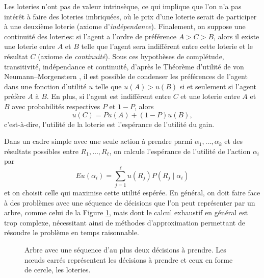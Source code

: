 \documentclass[a4paper,11pt]{article}
\theoremstyle{plain}
\theoremstyle{definition}
\begin{document}
Les loteries n'ont pas de valeur intrinsèque, ce qui implique que l'on n'a pas intérêt à faire des loteries imbriquées, où le prix d'une loterie serait de participer à une deuxième loterie (axiome d'\emph{indépendance}). Finalement, on suppose une continuité des loteries: si l'agent a l'ordre de préférence $A > C > B$, alors il existe une loterie entre $A$ et $B$ telle que l'agent sera indifférent entre cette loterie et le résultat $C$ (axiome de \emph{continuité}). Sous ces hypothèses de complétude, transitivité, indépendance et continuité, d'après le Théorème d'utilité de von Neumann--Morgenstern \cite{vonNeumann1953Theory}, il est possible de condenser les préférences de l'agent dans une fonction d'utilité $u$ telle que $u(A) > u(B)$ si et seulement si l'agent préfère $A$ à $B$. En plus, si l'agent est indifférent entre $C$ et une loterie entre $A$ et $B$ avec probabilités respectives $P$ et $1-P$, alors \[u(C) = Pu(A) + (1-P)u(B),\] c'est-à-dire, l'utilité de la loterie est l'espérance de l'utilité du gain.

Dans un cadre simple avec une seule action à prendre parmi $\alpha_1, \dotsc, \alpha_k$ et des résultats possibles entre $R_1, \dotsc, R_\ell$, on calcule l'espérance de l'utilité de l'action $\alpha_i$ par \[Eu(\alpha_i) = \sum_{j = 1}^\ell u(R_j)P(R_j\mid\alpha_i)\] et on choisit celle qui maximise cette utilité espérée. En général, on doit faire face à des problèmes avec une séquence de décisions que l'on peut représenter par un arbre, comme celui de la Figure \ref{arbre}, mais dont le calcul exhaustif en général est trop complexe, nécessitant ainsi de méthodes d'approximation permettant de résoudre le problème en temps raisonnable.

\begin{figure}[ht]
\centering
{}
\caption{Arbre avec une séquence d'au plus deux décisions à prendre. Les nœuds carrés représentent les décisions à prendre et ceux en forme de cercle, les loteries.}
\label{arbre}
\end{figure}
\end{document}
